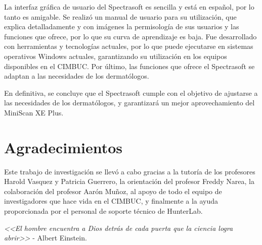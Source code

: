 \documentclass[conference]{IEEEtran}
\begin{document}
	La interfaz gr\'{a}fica de usuario del Spectrasoft es sencilla y est\'{a} en espa\~{n}ol, por lo tanto es amigable. Se realiz\'{o} un manual de usuario para su utilizaci\'{o}n, que explica detalladamente y con im\'{a}genes la permisolog\'{i}a de sus usuarios y las funciones que ofrece, por lo que su curva de aprendizaje es baja. Fue desarrollado con herramientas y tecnolog\'{i}as actuales, por lo que puede ejecutarse en sistemas operativos Windows actuales, garantizando su utilizaci\'{o}n en los equipos disponibles en el CIMBUC. Por \'{u}ltimo, las funciones que ofrece el Spectrasoft se adaptan a las necesidades de los dermat\'{o}logos.	

	En definitiva, se concluye que el Spectrasoft cumple con el objetivo de ajustarse a las necesidades de los dermat\'{o}logos, y garantizar\'{a} un mejor aprovechamiento del MiniScan XE Plus.

\section*{Agradecimientos}
	Este trabajo de investigaci\'{o}n se llev\'{o} a cabo gracias a la tutor\'{i}a de los profesores Harold Vasquez y Patricia \mbox{Guerrero}, la orientaci\'{o}n del profesor Freddy Narea, la colaboraci\'{o}n del profesor Aar\'{o}n Mu\~{n}oz, al apoyo de todo el equipo de investigadores que hace vida en el CIMBUC, y finalmente a la ayuda proporcionada por el personal de soporte t\'{e}cnico de HunterLab.
	
	\textit{<<El hombre encuentra a Dios detr\'{a}s de cada puerta que la ciencia logra abrir>>} - Albert Einstein.


\end{document}
